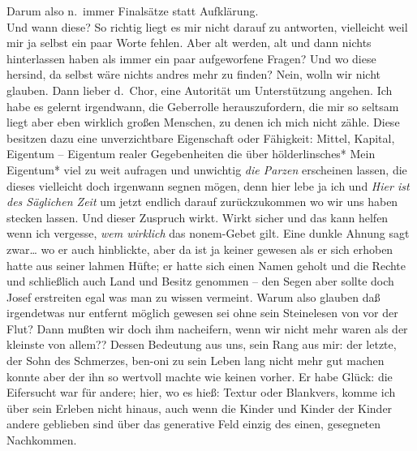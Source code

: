 \documentclass[
]{article}
\begin{document}
Darum also n.~immer Finalsätze statt Aufklärung.\\
Und wann diese? So richtig liegt es mir nicht darauf zu antworten,
vielleicht weil mir ja selbst ein paar Worte fehlen. Aber alt werden,
alt und dann nichts hinterlassen haben als immer ein paar aufgeworfene
Fragen? Und wo diese hersind, da selbst wäre nichts andres mehr zu
finden? Nein, wolln wir nicht glauben. Dann lieber d.~Chor, eine
Autorität um Unterstützung angehen. Ich habe es gelernt irgendwann, die
Geberrolle herauszufordern, die mir so seltsam liegt aber eben wirklich
großen Menschen, zu denen ich mich nicht zähle. Diese besitzen dazu eine
unverzichtbare Eigenschaft oder Fähigkeit: Mittel, Kapital, Eigentum --
Eigentum realer Gegebenheiten die über hölderlinsches* Mein Eigentum*
viel zu weit aufragen und unwichtig \emph{die Parzen} erscheinen lassen,
die dieses vielleicht doch irgenwann segnen mögen, denn hier lebe ja ich
und \emph{Hier ist des Säglichen Zeit} um jetzt endlich darauf
zurückzukommen wo wir uns haben stecken lassen. Und dieser Zuspruch
wirkt. Wirkt sicher und das kann helfen wenn ich vergesse, \emph{wem
wirklich} das nonem-Gebet gilt. Eine dunkle Ahnung sagt zwar\ldots{} wo
er auch hinblickte, aber da ist ja keiner gewesen als er sich erhoben
hatte aus seiner lahmen Hüfte; er hatte sich einen Namen geholt und die
Rechte und schließlich auch Land und Besitz genommen -- den Segen aber
sollte doch Josef erstreiten egal was man zu wissen vermeint. Warum also
glauben daß irgendetwas nur entfernt möglich gewesen sei ohne sein
Steinelesen von vor der Flut? Dann mußten wir doch ihm nacheifern, wenn
wir nicht mehr waren als der kleinste von allem?? Dessen Bedeutung aus
uns, sein Rang aus mir: der letzte, der Sohn des Schmerzes, ben-oni zu
sein Leben lang nicht mehr gut machen konnte aber der ihn so wertvoll
machte wie keinen vorher. Er habe Glück: die Eifersucht war für andere;
hier, wo es hieß: Textur oder Blankvers, komme ich über sein Erleben
nicht hinaus, auch wenn die Kinder und Kinder der Kinder andere
geblieben sind über das generative Feld einzig des einen, gesegneten
Nachkommen.
\end{document}
